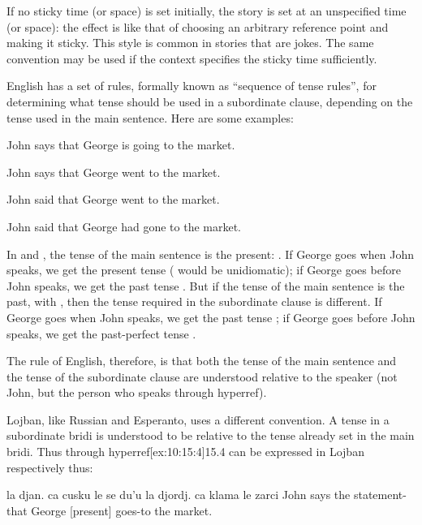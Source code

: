 If no sticky time (or space) is set initially, the story is
    set at an unspecified time (or space): the effect is like that
    of choosing an arbitrary reference point and making it sticky.
    This style is common in stories that are jokes. The same
    convention may be used if the context specifies the sticky time
    sufficiently.



English has a set of rules, formally known as ``sequence of
    tense rules'', for determining what tense should be used in a
    subordinate clause, depending on the tense used in the main
    sentence. Here are some examples:
\begin{example}
John says that George is going to the market.
\end{example}

\begin{example}
John says that George went to the market.
\end{example}

\begin{example}
John said that George went to the market.
\end{example}

\begin{example}
John said that George had gone to the market.
\end{example}

In  and , the tense of the main sentence
    is the present: . If George goes when John speaks, we
    get the present tense  ( would be
    unidiomatic); if George goes before John speaks, we get the
    past tense . But if the tense of the main sentence is
    the past, with , then the tense required in the
    subordinate clause is different. If George goes when John
    speaks, we get the past tense ; if George goes before
    John speaks, we get the past-perfect tense .

The rule of English, therefore, is that both the tense of
    the main sentence and the tense of the subordinate clause are
    understood relative to the speaker (not John, but the person
    who speaks  through hyperref).

Lojban, like Russian and Esperanto, uses a different
    convention. A tense in a subordinate bridi is understood to be
    relative to the tense already set in the main bridi. Thus  through hyperref[ex:10:15:4]{15.4} can be expressed in Lojban respectively
    thus:
\begin{example}
la djan. ca cusku le se du'u\n
\T	la djordj. ca klama le zarci\n
John  says the statement-that\n
\T	George [present] goes-to the market.
\end{example}

